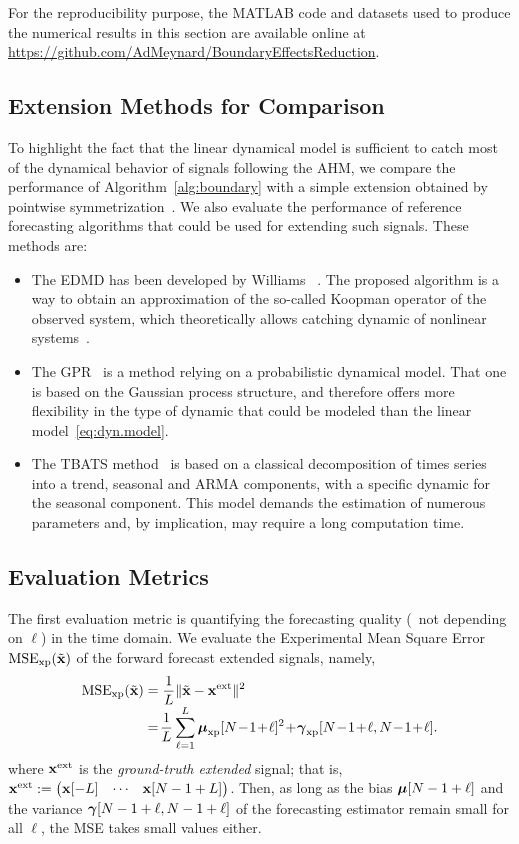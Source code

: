 For the reproducibility purpose, the MATLAB code and datasets used to produce the numerical results in this section are available online at \url{https://github.com/AdMeynard/BoundaryEffectsReduction}.


\subsection{Extension Methods for Comparison}
To highlight the fact that the linear dynamical model is sufficient to catch most of the dynamical behavior of signals following the AHM, we compare the performance of Algorithm~\ref{alg:boundary} with a simple extension obtained by pointwise symmetrization~\cite{Kharitonenko02wavelet}. We also evaluate the performance of reference forecasting algorithms that could be used for extending such signals. These methods are:
\begin{itemize}
\item The EDMD has been developed by Williams \etal~\cite{Williams15data}. The proposed algorithm is a way to obtain an approximation of the so-called Koopman operator of the observed system, which theoretically allows catching dynamic of nonlinear systems~\cite{Korda18linear}.
\item The GPR~\cite{Rasmussen06gaussian} is a method relying on a probabilistic dynamical model. That one is based on the Gaussian process structure, and therefore offers more flexibility in the type of dynamic that could be modeled than the linear model~\eqref{eq:dyn.model}.
\item The TBATS method~\cite{DeLivera11forecasting} is based on a classical decomposition of times series into a trend, seasonal and ARMA components, with a specific dynamic for the seasonal component. This model demands the estimation of numerous parameters and, by implication, may require a long computation time.
\end{itemize}


\subsection{Evaluation Metrics}

The first evaluation metric is quantifying the forecasting quality (\ie~not depending on $\ell$) in the time domain. We evaluate the Experimental Mean Square Error $\mathrm{MSE_{xp}}(\tilde{{\mathbf x}})$ of the forward forecast extended signals, namely,
\begin{align}
\label{eq:mse}
\mathrm{MSE_{\xp}}(\tilde\bx) &= \dfrac1{L}\|\tilde\bx -\bx^\mathrm{ext}\|^2 \\[-1mm]
\nonumber
&=\! \dfrac1{L}\sum_{\ell=1}^L \bmu_{\xp}[N\!-\!1\!+\!\ell]^2 \!+\! \bgamma_{\xp}[N\!-\!1\!+\!\ell,N\!-\!1\!+\!\ell] .
\end{align}
where ${\mathbf x}^\mathrm{ext}$ is the {\em ground-truth extended} signal; that is, ${\mathbf x}^\mathrm{ext} := \begin{pmatrix}{\mathbf x}[-L] & \cdots & {\mathbf x}[N-1+L] \end{pmatrix}$. Then, as long as the bias $\boldsymbol{\mu}[N-1+\ell]$ and the variance $\boldsymbol{\gamma}[N-1+\ell,N-1+\ell]$ of the forecasting estimator remain small for all $\ell$, the MSE takes small values either.



